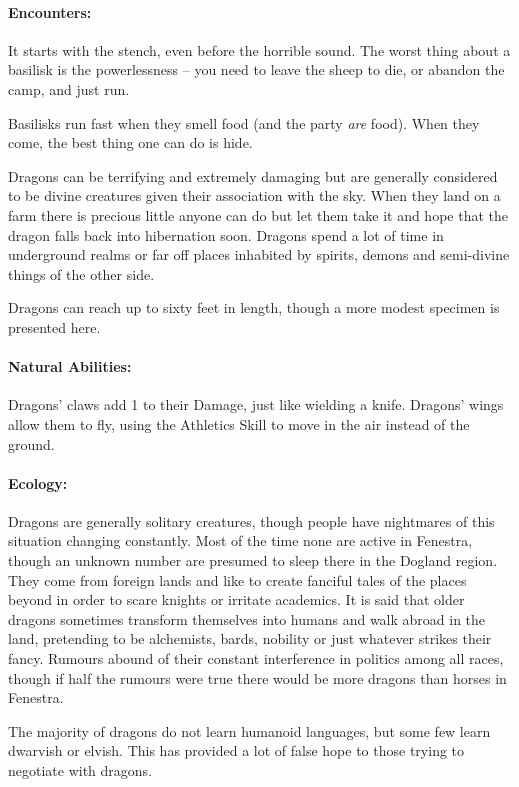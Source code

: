 \begin{multicols}{2}
\paragraph{Encounters:} It starts with the stench, even before the horrible sound.
The worst thing about a basilisk is the powerlessness -- you need to leave the sheep to die, or abandon the camp, and just run.

Basilisks run fast when they smell food (and the party \emph{are} food).
When they come, the best thing one can do is hide.

\label{dragon}

Dragons can be terrifying and extremely damaging but are generally considered to be divine creatures given their association with the sky.
When they land on a farm there is precious little anyone can do but let them take it and hope that the dragon falls back into hibernation soon.
Dragons spend a lot of time in underground realms or far off places inhabited by spirits, demons and semi-divine things of the other side.

Dragons can reach up to sixty feet in length, though a more modest specimen is presented here.

\paragraph{Natural Abilities:} Dragons' claws add 1 to their Damage, just like wielding a knife.
Dragons' wings allow them to fly, using the Athletics Skill to move in the air instead of the ground.

\paragraph{Ecology:} Dragons are generally solitary creatures, though people have nightmares of this situation changing constantly.
Most of the time none are active in Fenestra, though an unknown number are presumed to sleep there in the Dogland region.
They come from foreign lands and like to create fanciful tales of the places beyond in order to scare knights or irritate academics.
It is said that older dragons sometimes transform themselves into humans and walk abroad in the land, pretending to be alchemists, bards, nobility or just whatever strikes their fancy.
Rumours abound of their constant interference in politics among all races, though if half the rumours were true there would be more dragons than horses in Fenestra.

The majority of dragons do not learn humanoid languages, but some few learn dwarvish or elvish.
This has provided a lot of false hope to those trying to negotiate with dragons.


\end{multicols}
